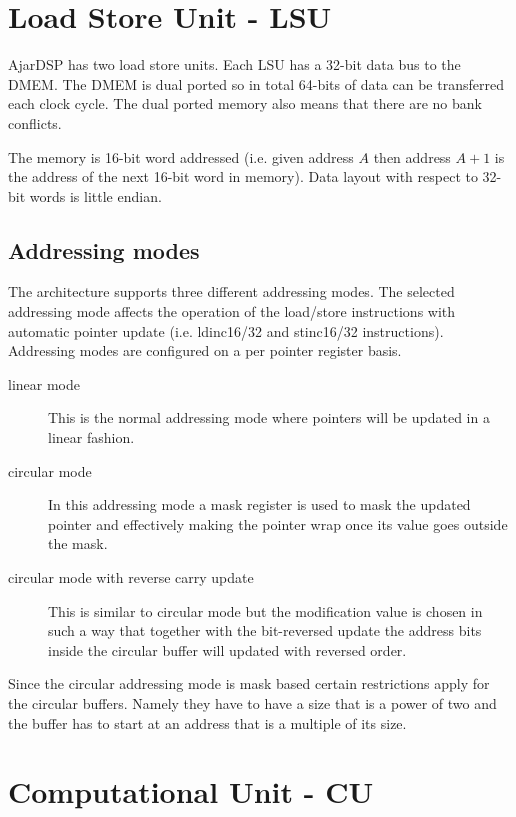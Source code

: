 \documentclass[11pt]{book}
\begin{document}
\section{Load Store Unit - LSU}
AjarDSP has two load store units. Each LSU has a 32-bit data bus to
the DMEM. The DMEM is dual ported so in total 64-bits of data can be
transferred each clock cycle. The dual ported memory also means that
there are no bank conflicts.

The memory is 16-bit word addressed (i.e. given address $A$ then
address $A+1$ is the address of the next 16-bit word in memory). Data
layout with respect to 32-bit words is little endian.

\subsection{Addressing modes}
The architecture supports three different addressing modes. The
selected addressing mode affects the operation of the load/store
instructions with automatic pointer update (i.e. ldinc16/32 and
stinc16/32 instructions). Addressing modes are configured on a per
pointer register basis.

\begin{description}
  \item[linear mode] This is the normal addressing mode where pointers
    will be updated in a linear fashion.
  \item[circular mode] In this addressing mode a mask register is used
    to mask the updated pointer and effectively making the pointer
    wrap once its value goes outside the mask.
  \item[circular mode with reverse carry update] This is similar to
    circular mode but the modification value is chosen in such a way
    that together with the bit-reversed update the address bits inside
    the circular buffer will updated with reversed order.
\end{description}

Since the circular addressing mode is mask based certain restrictions
apply for the circular buffers. Namely they have to have a size that
is a power of two and the buffer has to start at an address that is a
multiple of its size.




\section{Computational Unit - CU}
\end{document}
